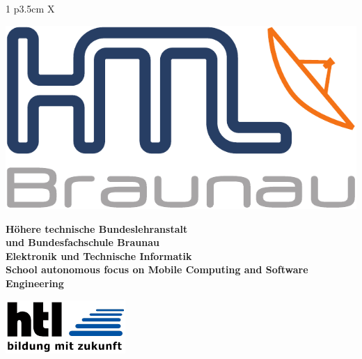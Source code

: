 \begin{tabularx}{1\textwidth}{ p{3.5cm} X }
\end{tabularx}


\pagebreak
\thispagestyle{empty}


\begin{minipage}[c]{0.20\linewidth}
\includegraphics[width=0.8\linewidth]{media/images/htl_c_cmyk_rein}
\end{minipage}
\begin{minipage}[c]{0.6\linewidth}
\begin{center}
{\bfseries\sffamily\large Höhere  technische  Bundeslehranstalt\\
und  Bundesfachschule  Braunau\\
Elektronik und Technische Informatik\\
{\normalsize School autonomous focus on Mobile Computing and Software Engineering} }
\end{center}
\end{minipage}
\begin{minipage}[c]{0.2\linewidth}
\hfill \includegraphics[width=0.8\linewidth]{media/images/htl-bildung-mit-zukunft}
\end{minipage}\\

\vspace{1em}


